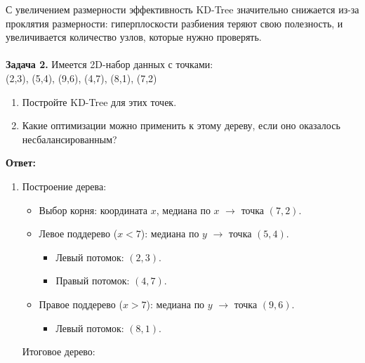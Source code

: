 С увеличением размерности эффективность KD-Tree значительно снижается из-за проклятия размерности: гиперплоскости разбиения теряют свою полезность, и увеличивается количество узлов, которые нужно проверять.\\
\\
\textbf{Задача 2.}
Имеется 2D-набор данных с точками:\\ 
(2,3), (5,4), (9,6), (4,7), (8,1), (7,2)
\begin{enumerate}
    \item Постройте KD-Tree для этих точек.
    \item Какие оптимизации можно применить к этому дереву, если оно оказалось несбалансированным?
\end{enumerate}
\textbf{Ответ:}
\begin{enumerate}
    \item Построение дерева:
    \begin{itemize}
        \item Выбор корня: координата \(x\), медиана по \(x\) \( \rightarrow \) точка \((7, 2)\).
        \item Левое поддерево (\(x < 7\)): медиана по \(y\) \( \rightarrow \) точка \((5, 4)\).
        \begin{itemize}
            \item Левый потомок: \((2, 3)\).
            \item Правый потомок: \((4, 7)\).
        \end{itemize}
        \item Правое поддерево (\(x > 7\)): медиана по \(y\) \( \rightarrow \) точка \((9, 6)\).
        \begin{itemize}
            \item Левый потомок: \((8, 1)\).
        \end{itemize}
    \end{itemize}
    Итоговое дерево:


\end{enumerate}
